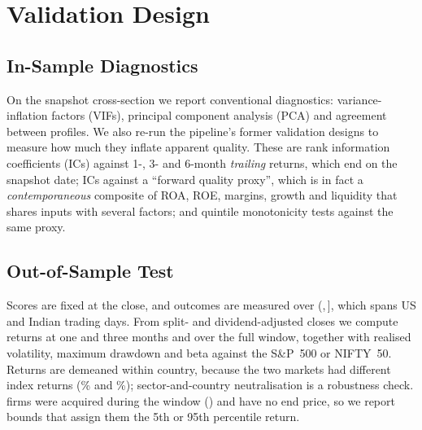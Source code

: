 \section{Validation Design}
\label{sec:validation}

\subsection{In-Sample Diagnostics}
\label{sec:insample_design}

On the snapshot cross-section we report conventional diagnostics:
variance-inflation factors (VIFs), principal component analysis (PCA) and
agreement between profiles. We also re-run the pipeline's former validation
designs to measure how much they inflate apparent quality. These are rank
information coefficients (ICs) against 1-, 3- and 6-month \emph{trailing}
returns, which end on the snapshot date; ICs against a ``forward quality
proxy'', which is in fact a \emph{contemporaneous} composite of ROA, ROE,
margins, growth and liquidity that shares inputs with several factors; and
quintile monotonicity tests against the same proxy.

\subsection{Out-of-Sample Test}
\label{sec:oos_design}

Scores are fixed at the \SnapshotDate close, and outcomes are measured over
(\SnapshotDate,\,\OOSEndDate], which spans \TradingDaysUS US and
\TradingDaysIndia Indian trading days. From split- and dividend-adjusted
closes we compute returns at one and three months and over the full window,
together with realised volatility, maximum drawdown and beta against the
S\&P~500 or NIFTY~50. Returns are demeaned within country, because the two
markets had different index returns (\IdxRetUS\% and \IdxRetIndia\%);
sector-and-country neutralisation is a robustness check. \NExited firms were
acquired during the window (\ExitedTickers) and have no end price, so we
report bounds that assign them the 5th or 95th percentile return.


